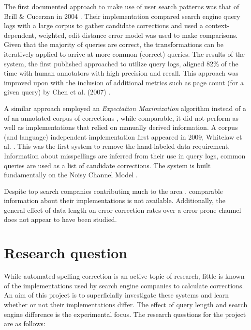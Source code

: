 \documentclass{csfourzero}
\begin{document}
The first documented approach to make use of user search patterns was that of Brill \& Cucerzan in 2004 \cite{webuserpoweredspelling}. Their implementation compared search engine query logs with a large corpus to gather candidate corrections and used a context-dependent, weighted, edit distance error model was used to make comparisons. Given that the majority of queries are correct, the transformations can be iteratively applied to arrive at more common (correct) queries. The results of the system, the first published approached to utilize query logs, aligned 82\% of the time with human annotators with high precision and recall. This approach was improved upon with the inclusion of additional metrics such as page count (for a given query) by Chen et al. (2007) \cite{webuser3}.

A similar approach employed an \textit{Expectation Maximization} algorithm instead of a of an annotated corpus of corrections \cite{webuser2learningerrormodel}, while comparable, it did not perform as well as implementations that relied on manually derived information. A corpus (and language) independent implementation first appeared in 2009, Whitelaw et al. \cite{webuser4google2009}. This was the first system to remove the hand-labeled data requirement. Information about misspellings are inferred from their use in query logs, common queries are used as a list of candidate corrections. The system is built fundamentally on the Noisy Channel Model \cite{claudeshannon1948}.

Despite top search companies contributing much to the area \cite{webuser3, webuserpoweredspelling, microranker, microphone, webuser4google2009}, comparable information about their implementations is not available. Additionally, the general effect of data length on error correction rates over a error prone channel does not appear to have been studied.

\section{Research question}
\label{sec:rq}

While automated spelling correction is an active topic of research, little is known of the implementations used by search engine companies to calculate corrections. An aim of this project is to superficially investigate these systems and learn whether or not their implementations differ. The effect of query length and search engine difference is the experimental focus. The research questions for the project are as follows:
\end{document}
